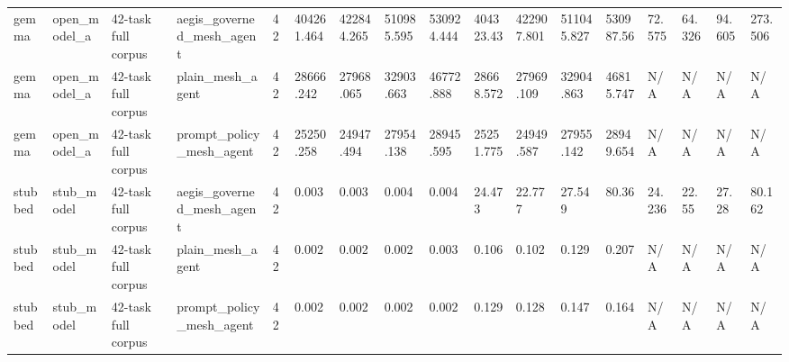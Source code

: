 \begin{tabular}{lllllllllllllllll}
gemma & open\_model\_a & 42-task full corpus & aegis\_governed\_mesh\_agent & 42 & 404261.464 & 422844.265 & 510985.595 & 530924.444 & 404323.43 & 422907.801 & 511045.827 & 530987.56 & 72.575 & 64.326 & 94.605 & 273.506 \\
gemma & open\_model\_a & 42-task full corpus & plain\_mesh\_agent & 42 & 28666.242 & 27968.065 & 32903.663 & 46772.888 & 28668.572 & 27969.109 & 32904.863 & 46815.747 & N/A & N/A & N/A & N/A \\
gemma & open\_model\_a & 42-task full corpus & prompt\_policy\_mesh\_agent & 42 & 25250.258 & 24947.494 & 27954.138 & 28945.595 & 25251.775 & 24949.587 & 27955.142 & 28949.654 & N/A & N/A & N/A & N/A \\
stubbed & stub\_model & 42-task full corpus & aegis\_governed\_mesh\_agent & 42 & 0.003 & 0.003 & 0.004 & 0.004 & 24.473 & 22.777 & 27.549 & 80.36 & 24.236 & 22.55 & 27.28 & 80.162 \\
stubbed & stub\_model & 42-task full corpus & plain\_mesh\_agent & 42 & 0.002 & 0.002 & 0.002 & 0.003 & 0.106 & 0.102 & 0.129 & 0.207 & N/A & N/A & N/A & N/A \\
stubbed & stub\_model & 42-task full corpus & prompt\_policy\_mesh\_agent & 42 & 0.002 & 0.002 & 0.002 & 0.002 & 0.129 & 0.128 & 0.147 & 0.164 & N/A & N/A & N/A & N/A \\
 \hline
\end{tabular}
